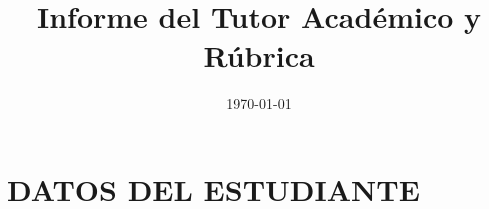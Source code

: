 %
%
%


\graphicspath{{../../Book/logos/}{../../Book/figures/}{../../Book/diagrams/}} %

\title{Informe del Tutor Académico y Rúbrica}  %
\date{\today}                                  %
\author{\myAcademicTutorFullName}                           %



%
%



\section*{DATOS DEL ESTUDIANTE}

